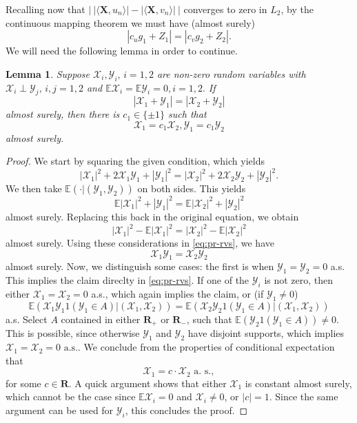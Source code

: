 \documentclass[a4paper,12pt]{amsart}
\newcommand{\cX}{\mathcal{X}}
\numberwithin{equation}{section}
\newtheorem{lemma}[theorem]{Lemma}
\newcommand{\R}{\mathbf R}
\newcommand{\X}{\mathbf X}
\newcommand{\E}{{\mathbb E}}
\newcommand{\cY}{\mathcal{Y}}
\begin{document}
Recalling now that $\left| \  |\langle \X,u_n\rangle| - |\langle \X,v_n\rangle| \ \right|$ converges to zero in $L_2$, by the continuous mapping theorem we must have (almost surely)
\begin{equation*}
|c_u g_1 + Z_1| = |c_v g_2 +Z_2|.
\end{equation*}
We will need the following lemma in order to continue. 

\begin{lemma}\label{lemma:SPR-rvs} Suppose $\mathcal{X}_i,\mathcal{Y}_i,\,i=1,2$ are non-zero random variables with $\mathcal{X}_i \perp \mathcal{Y}_j,\,i,j=1,2$ and $\E \mathcal{X}_i = \E \mathcal{Y}_i = 0, i =1,2.$ If 
\[
|\mathcal{X}_1 + \mathcal{Y}_1| = |\mathcal{X}_2 + \mathcal{Y}_2|
\]
almost surely, then there is $c_1 \in \{\pm 1\}$ such that 
\[
\mathcal{X}_1 = c_1 \mathcal{X}_2, \cY_1 = c_1 \cY_2 
\]
almost surely. 
\end{lemma}

\begin{proof} We start by squaring the given condition, which yields 
\begin{equation}\label{eq:pr-rvs} 
|\cX_1|^2 + 2 \cX_1 \cY_1 + |\cY_1|^2 = |\cX_2|^2 + 2 \cX_2 \cY_2 + |\cY_2|^2. 
\end{equation} 
We then take $\E(\cdot | (\cY_1,\cY_2))$ on both sides. This yields 
\[
\E |\cX_1|^2 + |\cY_1|^2 = \E |\cX_2|^2 + |\cY_2|^2
\]
almost surely. Replacing this back in the original equation, we obtain 
\[
|\cX_1|^2 - \E |\cX_1|^2 = |\cX_2|^2 - \E|\cX_2|^2
\]
almost surely. Using these considerations in \eqref{eq:pr-rvs}, we have 
\[
\cX_1 \cY_1 = \cX_2 \cY_2
\]
almost surely. Now, we distinguish some cases: the first is when $\cY_1 = \cY_2 = 0 $ a.s. This implies the claim direclty in \eqref{eq:pr-rvs}. If one of the $\cY_i$ is not zero, then either $\cX_1 = \cX_2 = 0$ a.s., which again implies the claim, or (if $\cY_1 \neq 0$)  
\[
\E( \cX_1 \cY_1 1(\cY_1 \in A) | (\cX_1,\cX_2)) = \E(\cX_2 \cY_2 1(\cY_1 \in A)| (\cX_1,\cX_2))
\]
a.s. Select $A$ contained in either $\R_+$ or $\R_{-}$, such that $\E(\cY_2 1(\cY_1 \in A)) \neq 0$. This is possible, since otherwise $\cY_1$ and $\cY_2$ have disjoint supports, which implies $\cX_1 = \cX_2 = 0 \text{ a.s.}$. We conclude from the properties of conditional expectation that 
\[
\cX_1 = c \cdot \cX_2 \text{ a. s.},
\]
for some $c \in \R$. A quick argument shows that either $\cX_1$ is constant almost surely, which cannot be the case since $\E \cX_i = 0$ and $\cX_i \neq 0$, or $|c|=1$. Since the same argument can be used for $\cY_i$, this concludes the proof. 
\end{proof}
\end{document}
